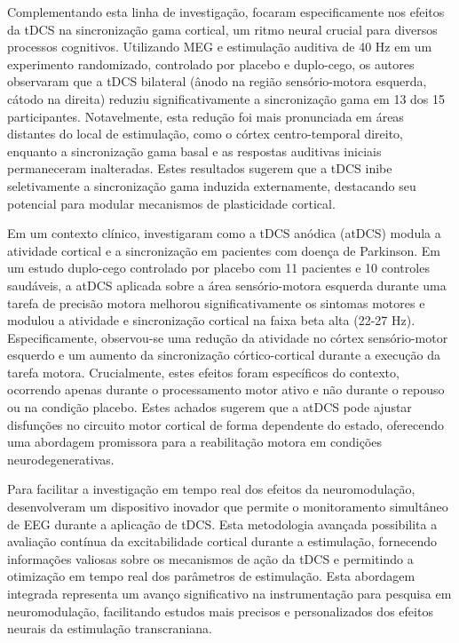 Complementando esta linha de investigação,  focaram especificamente nos efeitos da tDCS na sincronização gama cortical, um ritmo neural crucial para diversos processos cognitivos. Utilizando MEG e estimulação auditiva de 40 Hz em um experimento randomizado, controlado por placebo e duplo-cego, os autores observaram que a tDCS bilateral (ânodo na região sensório-motora esquerda, cátodo na direita) reduziu significativamente a sincronização gama em 13 dos 15 participantes. Notavelmente, esta redução foi mais pronunciada em áreas distantes do local de estimulação, como o córtex centro-temporal direito, enquanto a sincronização gama basal e as respostas auditivas iniciais permaneceram inalteradas. Estes resultados sugerem que a tDCS inibe seletivamente a sincronização gama induzida externamente, destacando seu potencial para modular mecanismos de plasticidade cortical.

Em um contexto clínico,  investigaram como a tDCS anódica (atDCS) modula a atividade cortical e a sincronização em pacientes com doença de Parkinson. Em um estudo duplo-cego controlado por placebo com 11 pacientes e 10 controles saudáveis, a atDCS aplicada sobre a área sensório-motora esquerda durante uma tarefa de precisão motora melhorou significativamente os sintomas motores e modulou a atividade e sincronização cortical na faixa beta alta (22-27 Hz). Especificamente, observou-se uma redução da atividade no córtex sensório-motor esquerdo e um aumento da sincronização córtico-cortical durante a execução da tarefa motora. Crucialmente, estes efeitos foram específicos do contexto, ocorrendo apenas durante o processamento motor ativo e não durante o repouso ou na condição placebo. Estes achados sugerem que a atDCS pode ajustar disfunções no circuito motor cortical de forma dependente do estado, oferecendo uma abordagem promissora para a reabilitação motora em condições neurodegenerativas.

Para facilitar a investigação em tempo real dos efeitos da neuromodulação,  desenvolveram um dispositivo inovador que permite o monitoramento simultâneo de EEG durante a aplicação de tDCS. Esta metodologia avançada possibilita a avaliação contínua da excitabilidade cortical durante a estimulação, fornecendo informações valiosas sobre os mecanismos de ação da tDCS e permitindo a otimização em tempo real dos parâmetros de estimulação. Esta abordagem integrada representa um avanço significativo na instrumentação para pesquisa em neuromodulação, facilitando estudos mais precisos e personalizados dos efeitos neurais da estimulação transcraniana.

